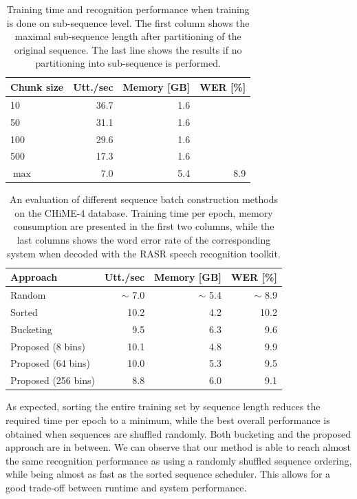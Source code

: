 \documentclass{article}
\begin{document}
	\begin{table}[tbp]
		\centering
		\caption{Training time and recognition performance when training is done 
		on sub-sequence level. The first column shows the maximal sub-sequence length 
		after partitioning of the original sequence. The last line shows the results 
		if no partitioning into sub-sequence is performed. }
		\label{tab:chime:chunk}
		\begin{tabular}{lrrr}
			\hline
			Chunk size              & Utt./sec & Memory [GB] & WER [\%] \\
			\hline
			10     					&	36.7   & 1.6         &			 \\
			50  					&	31.1   & 1.6		 &    		 \\
			100 					& 	29.6   & 1.6		 &			 \\
			500						& 	17.3   & 1.6         &			 \\
			$\max$					&	7.0	   & 5.4         &	8.9		 \\
			\hline
		\end{tabular}
	\end{table}

	\begin{table}[tbp]
		\centering
		\caption{An evaluation of different sequence batch construction methods on the CHiME-4 database. Training time per epoch, memory consumption are presented in the first two columns, while the last columns shows the word error rate of the corresponding system
		when decoded with the RASR speech recognition toolkit.}
		\label{tab:chime:batch}
		\begin{tabular}{lrrr}
			\hline
			Approach                & Utt./sec & Memory [GB] & WER [\%]          \\
			\hline
			Random 					& $\sim$ 7.0     & $\sim$ 5.4		 & $\sim$ 8.9		 \\
			Sorted					& 10.2    &	4.2 & 10.2		 \\
			\hline
			Bucketing				& 9.5     &	6.3		 & 9.6		 \\
			Proposed (8 bins)	    & 10.1	   & 4.8     & 9.9		 \\
			Proposed (64 bins)	    & 10.0     & 5.3     & 9.5		 \\
			Proposed (256 bins)	    & 8.8	   & 6.0     & 9.1		 \\
			\hline
		\end{tabular}
	\end{table}

  As expected, sorting the entire training set by sequence length reduces the required time 
  per epoch to a minimum, while the best overall performance is obtained when sequences are shuffled randomly. Both bucketing and the proposed 
  approach are in between. We can observe that our method is able to reach almost the same recognition performance as using a randomly shuffled sequence
  ordering, while being almost as fast as the sorted sequence scheduler. This allows for a good trade-off between runtime and system performance.
  
\end{document}
